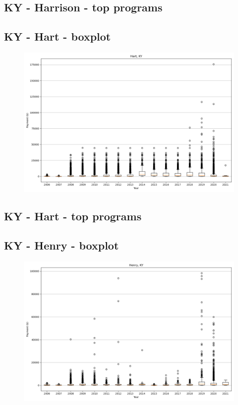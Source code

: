 \subsection*{KY - Harrison - top programs}

\newpage
\subsection*{KY - Hart - boxplot}
\begin{figure}[h]
\centering
\includegraphics[width=7in]{../output/boxplots/counties/Hart-KY_boxplot.png}
\end{figure}


\subsection*{KY - Hart - top programs}

\newpage
\subsection*{KY - Henry - boxplot}
\begin{figure}[h]
\centering
\includegraphics[width=7in]{../output/boxplots/counties/Henry-KY_boxplot.png}
\end{figure}


